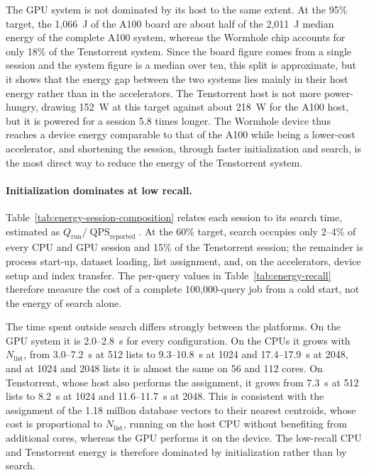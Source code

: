 The GPU system is not dominated by its host to the same extent. At the 95\%
target, the 1,066~J of the A100 board are about half of the 2,011~J median
energy of the complete A100 system, whereas the Wormhole chip accounts for only
18\% of the Tenstorrent system. Since the board figure comes from a single
session and the system figure is a median over ten, this split is approximate,
but it shows that the energy gap between the two systems lies mainly in their
host energy rather than in the accelerators. The Tenstorrent host is not more
power-hungry, drawing 152~W at this target against about 218~W for the A100
host, but it is powered for a session 5.8 times longer. The Wormhole device
thus reaches a device energy comparable to that of the A100 while being a
lower-cost accelerator, and shortening the session, through faster
initialization and search, is the most direct way to reduce the energy of the
Tenstorrent system.

\paragraph{Initialization dominates at low recall.}
Table~\ref{tab:energy-session-composition} relates each session to its search
time, estimated as \(Q_{\mathrm{run}}/\operatorname{QPS}_{\mathrm{reported}}\).
At the 60\% target, search occupies only 2--4\% of every CPU and GPU session
and 15\% of the Tenstorrent session; the remainder is process start-up,
dataset loading, list assignment, and, on the accelerators, device setup and
index transfer. The per-query values in
Table~\ref{tab:energy-recall} therefore measure the cost of a complete
100,000-query job from a cold start, not the energy of search alone.

The time spent outside search differs strongly between the platforms. On the
GPU system it is 2.0--2.8~s for every configuration. On the CPUs it grows with
\(N_{\mathrm{list}}\), from 3.0--7.2~s at 512 lists to 9.3--10.8~s at 1024 and
17.4--17.9~s at 2048, and at 1024 and 2048 lists it is almost the same on 56
and 112 cores. On
Tenstorrent, whose host also performs the assignment, it grows from 7.3~s at
512 lists to 8.2~s at 1024 and 11.6--11.7~s at 2048. This is consistent with
the assignment of the 1.18 million database vectors to their nearest
centroids, whose cost is proportional to \(N_{\mathrm{list}}\), running on the
host CPU without benefiting from additional cores, whereas the GPU performs it
on the device. The low-recall CPU and Tenstorrent energy is therefore
dominated by initialization rather than by search.

